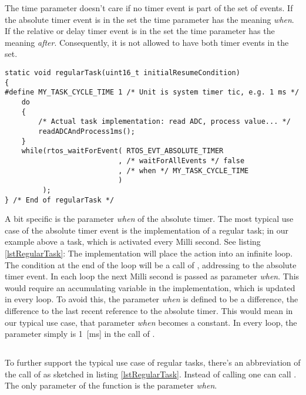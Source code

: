 The time parameter doesn't care if no timer event is part of the set of
events. If the absolute timer event is in the set the time parameter has
the meaning \emph{when}. If the relative or delay timer event is in the
set the time parameter has the meaning \emph{after}. Consequently, it is
not allowed to have both timer events in the set.

\begin{lstlisting}[float, caption=Typical use case: regular task,
label=lstRegularTask, captionpos=b]
static void regularTask(uint16_t initialResumeCondition)
{
#define MY_TASK_CYCLE_TIME 1 /* Unit is system timer tic, e.g. 1 ms */
    do
    {
        /* Actual task implementation: read ADC, process value... */
        readADCAndProcess1ms();
    }
    while(rtos_waitForEvent( RTOS_EVT_ABSOLUTE_TIMER
                           , /* waitForAllEvents */ false
                           , /* when */ MY_TASK_CYCLE_TIME
                           )
         );
} /* End of regularTask */
\end{lstlisting}

A bit specific is the parameter \emph{when} of the absolute timer. The
most typical use case of the absolute timer event is the implementation of
a regular task; in our example above a task, which is activated every
Milli second. See listing \ref{lstRegularTask}: The implementation will
place the action into an infinite loop. The  condition at the
end of the loop will be a call of , addressing
to the absolute timer event. In each loop the next Milli second is passed
as parameter \emph{when}. This would require an accumulating variable in
the implementation, which is updated in every loop. To avoid this, the
parameter \emph{when} is defined to be a difference, the difference to the
last recent reference to the absolute timer. This would mean in our typical
use case, that parameter \emph{when} becomes a constant. In every loop,
the parameter simply is 1~[ms] in the call of .


\subsection{}

To further support the typical use case of regular tasks, there's an
abbreviation of the call of  as sketched in
listing \ref{lstRegularTask}. Instead of calling
 one can call
. The only parameter of the
function is the parameter \emph{when}.

